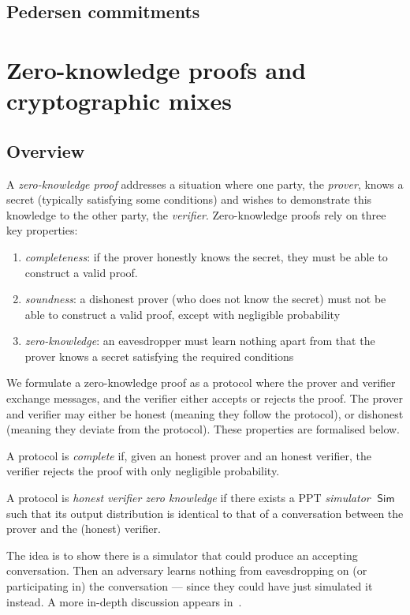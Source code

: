 \documentclass[11pt,twoside,a4paper]{article}
\DeclareMathOperator{\Sim}{\mathsf{Sim}}
\theoremstyle{definition}
\begin{document}
\subsection{Pedersen commitments}
\newpage
\section{Zero-knowledge proofs and cryptographic mixes}\label{app-proof}
\subsection{Overview}
A \textit{zero-knowledge proof} addresses a situation where one party, the \textit{prover}, knows a secret (typically satisfying some conditions) and wishes to demonstrate this knowledge to the other party, the \textit{verifier}. Zero-knowledge proofs rely on three key properties:
\begin{enumerate}
    \item \textit{completeness}: if the prover honestly knows the secret, they must be able to construct a valid proof.
    \item \textit{soundness}: a dishonest prover (who does not know the secret) must not be able to construct a valid proof, except with negligible probability
    \item \textit{zero-knowledge}: an eavesdropper must learn nothing apart from that the prover knows a secret satisfying the required conditions
\end{enumerate}
We formulate a zero-knowledge proof as a protocol where the prover and verifier exchange messages, and the verifier either accepts or rejects the proof. The prover and verifier may either be honest (meaning they follow the protocol), or dishonest (meaning they deviate from the protocol). These properties are formalised below.
\begin{definition}[Complete]
    A protocol is \textit{complete} if, given an honest prover and an honest verifier, the verifier rejects the proof with only negligible probability.
\end{definition}
\begin{definition}
    A protocol is \textit{honest verifier zero knowledge} if there exists a PPT \textit{simulator} $\Sim$ such that its output distribution is identical to that of a conversation between the prover and the (honest) verifier.
\end{definition}
The idea is to show there is a simulator that could produce an accepting conversation. Then an adversary learns nothing from eavesdropping on (or participating in) the conversation --- since they could have just simulated it instead. A more in-depth discussion appears in~\cite{boneh2020graduate}.
\end{document}
